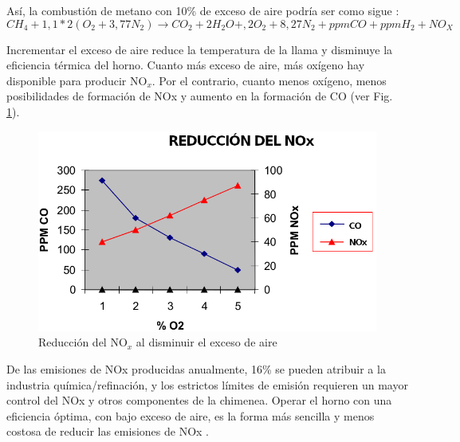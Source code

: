 \par Así, la combustión de metano con 10\% de exceso de aire podría ser como sigue \cite{bib:thermox}:
\begin{equation}
CH_4 + 1,1*2(O_2 + 3,77N_2) \rightarrow CO_2 + 2H_2O + ,2O_2 + 8,27N_2 + ppmCO + ppmH_2 + NO_X\end{equation}
\par Incrementar el exceso de aire reduce la temperatura de la llama y disminuye la eficiencia térmica del horno. Cuanto más exceso de aire, más oxígeno hay disponible para producir NO$_x$. Por el contrario, cuanto menos oxígeno, menos posibilidades de formación de NOx y aumento en la formación de CO (ver Fig. \ref{fig:nox}).
\begin{figure}[H] \begin{center}
\includegraphics[scale=0.42]{images/nox}
\caption[Reducción del NO$_x$ al disminuir el exceso de aire de combustión]{Reducción del NO$_x$ al disminuir el exceso de aire \cite{bib:thermox}}
\label{fig:nox} \end{center} \end{figure}
\par De las emisiones de NOx producidas anualmente, 16\% se pueden atribuir a la industria química/refinación, y los estrictos límites de emisión requieren un mayor control del NOx y otros componentes de la chimenea. Operar el horno con una eficiencia óptima, con bajo exceso de aire, es la forma más sencilla y menos costosa de reducir las emisiones de NOx \cite{bib:thermox}.

